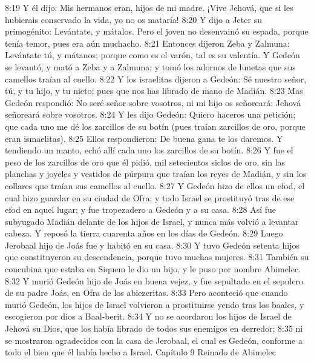 8:19 Y él dijo: Mis hermanos eran, hijos de mi madre. ¡Vive Jehová, que si les hubierais conservado la vida, yo no os mataría!  
8:20 Y dijo a Jeter su primogénito: Levántate, y mátalos. Pero el joven no desenvainó su espada, porque tenía temor, pues era aún muchacho.  
8:21 Entonces dijeron Zeba y Zalmuna: Levántate tú, y mátanos; porque como es el varón, tal es su valentía. Y Gedeón se levantó, y mató a Zeba y a Zalmuna; y tomó los adornos de lunetas que sus camellos traían al cuello.  
8:22 Y los israelitas dijeron a Gedeón: Sé nuestro señor, tú, y tu hijo, y tu nieto; pues que nos has librado de mano de Madián.  
8:23 Mas Gedeón respondió: No seré señor sobre vosotros, ni mi hijo os señoreará: Jehová señoreará sobre vosotros.  
8:24 Y les dijo Gedeón: Quiero haceros una petición; que cada uno me dé los zarcillos de su botín (pues traían zarcillos de oro, porque eran ismaelitas).  
8:25 Ellos respondieron: De buena gana te los daremos. Y tendiendo un manto, echó allí cada uno los zarcillos de su botín.  
8:26 Y fue el peso de los zarcillos de oro que él pidió, mil setecientos siclos de oro,  sin las planchas y joyeles y vestidos de púrpura que traían los reyes de Madián, y sin los collares que traían sus camellos al cuello.  
8:27 Y Gedeón hizo de ellos un efod, el cual hizo guardar en su ciudad de Ofra; y todo Israel se prostituyó tras de ese efod en aquel lugar; y fue tropezadero a Gedeón y a su casa.  
8:28 Así fue subyugado Madián delante de los hijos de Israel, y nunca más volvió a levantar cabeza. Y reposó la tierra cuarenta años en los días de Gedeón.  
8:29 Luego Jerobaal hijo de Joás fue y habitó en su casa.  
8:30 Y tuvo Gedeón setenta hijos que constituyeron su descendencia, porque tuvo muchas mujeres.  
8:31 También su concubina que estaba en Siquem le dio un hijo, y le puso por nombre Abimelec.  
8:32 Y murió Gedeón hijo de Joás en buena vejez, y fue sepultado en el sepulcro de su padre Joás, en Ofra de los abiezeritas.  
8:33 Pero aconteció que cuando murió Gedeón, los hijos de Israel volvieron a prostituirse yendo tras los baales, y escogieron por dios a Baal-berit.  
8:34 Y no se acordaron los hijos de Israel de Jehová su Dios, que los había librado de todos sus enemigos en derredor;  
8:35 ni se mostraron agradecidos con la casa de Jerobaal, el cual es Gedeón, conforme a todo el bien que él había hecho a Israel.  
Capítulo 9
Reinado de Abimelec  

